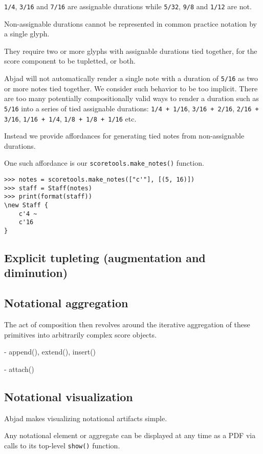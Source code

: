 \texttt{1/4}, \texttt{3/16} and \texttt{7/16} are assignable durations while
\texttt{5/32}, \texttt{9/8} and \texttt{1/12} are not.

Non-assignable durations cannot be represented in common practice notation by a
single glyph.

They require two or more glyphs with assignable durations tied together,
for the score component to be tupletted, or both.

Abjad will not automatically render a single note with a duration of
\texttt{5/16} as two or more notes tied together. We consider such behavior to
be too implicit. There are too many potentially compositionally valid ways to
render a duration such as \texttt{5/16} into a series of tied assignable
durations: \texttt{1/4 + 1/16}, \texttt{3/16 + 2/16}, \texttt{2/16 + 3/16},
\texttt{1/16 + 1/4}, \texttt{1/8 + 1/8 + 1/16} etc.

Instead we provide affordances for generating tied notes from
non-assignable durations.

One such affordance is our \texttt{scoretools.make\_notes()} function.

\begin{lstlisting}
>>> notes = scoretools.make_notes(["c'"], [(5, 16)])
>>> staff = Staff(notes)
>>> print(format(staff))
\new Staff {
    c'4 ~
    c'16
}
\end{lstlisting}

\subsection{Explicit tupleting (augmentation and diminution)}



\subsection{Notational aggregation}

The act of composition then revolves around the iterative aggregation of these
primitives into arbitrarily complex score objects.

- append(), extend(), insert()

- attach()

\subsection{Notational visualization}

Abjad makes visualizing notational artifacts simple.

Any notational element or aggregate can be displayed at any time as a PDF via
calls to its top-level \texttt{show()} function.